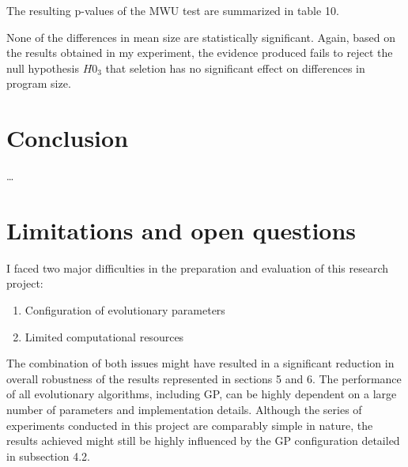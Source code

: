 \documentclass[
  12pt,
]{article}
\providecommand{\tightlist}{%
  \setlength{\itemsep}{0pt}\setlength{\parskip}{0pt}}
\begin{document}
The resulting p-values of the MWU test are summarized in table 10.

\begin{table}[!h]

\caption{\label{tab:unnamed-chunk-10}Mean Size - P-Values}
\centering
{}
\end{table}

None of the differences in mean size are statistically significant.
Again, based on the results obtained in my experiment, the evidence
produced fails to reject the null hypothesis \(H0_{3}\) that seletion
has no significant effect on differences in program size.

\hypertarget{conclusion}{%
\section{Conclusion}\label{conclusion}}

\ldots{}

\hypertarget{limitations-and-open-questions}{%
\section{Limitations and open
questions}\label{limitations-and-open-questions}}

I faced two major difficulties in the preparation and evaluation of this
research project:

\begin{enumerate}
\def\labelenumi{\arabic{enumi}.}
\tightlist
\item
  Configuration of evolutionary parameters
\item
  Limited computational resources
\end{enumerate}

The combination of both issues might have resulted in a significant
reduction in overall robustness of the results represented in sections 5
and 6. The performance of all evolutionary algorithms, including GP, can
be highly dependent on a large number of parameters and implementation
details. Although the series of experiments conducted in this project
are comparably simple in nature, the results achieved might still be
highly influenced by the GP configuration detailed in subsection 4.2.
\end{document}
